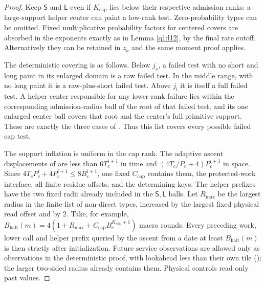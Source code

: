 \begin{proof}
Keep \(\mathsf S\) and \(\mathsf L\) even if \(K_{\mathrm{cap}}\) lies below their respective admission ranks: a large-support helper center can paint a low-rank test. Zero-probability types can be omitted. Fixed multiplicative probability factors for centered covers are absorbed in the exponents exactly as in Lemma \ref{q1:l12}, by the final rate cutoff. Alternatively they can be retained in \(z_{a}\) and the same moment proof applies.

The deterministic covering is as follows. Below \(j_{s}\), a failed test with no short and long paint in its enlarged domain is a raw failed test. In the middle range, with no long paint it is a raw-plus-short failed test. Above \(j_{l}\) it is itself a full failed test. A helper center responsible for any lower-rank failure lies within the corresponding admission-radius ball of the root of that failed test, and its one enlarged center ball covers that root and the center's full primitive support. These are exactly the three cases of \cite[Lemma~\ref*{cl:lem:joint}]{DMNoise1D2026}. Thus this list covers every possible failed cap test.

The support inflation is uniform in the cap rank. The adaptive ascent displacements of \cite[Lemma~\ref*{cl:lem:ascent}]{DMNoise1D2026} are less than \(6T_{c}^{i+1}\) in time and \((4T_{c}/P_{c}+4)P_{c}^{i+1}\) in space. Since \(4T_{c} P_{c}^{i}+4P_{c}^{i+1} \le  8 B_{c}^{i+1}\), one fixed \(C_{\mathrm{cap}}\) contains them, the protected-work interface, all finite residue offsets, and the determining keys. The helper prefixes have the two fixed radii already included in the \(\mathsf S,\mathsf L\) balls. Let \(R_{\mathrm{max}}\) be the largest radius in the finite list of non-direct types, increased by the largest fixed physical read offset and by 2. Take, for example, \(B_{\mathrm{halt}}(m)=4(1+R_{\mathrm{max}}+C_{\mathrm{cap}} B_{c}^{K_{\mathrm{cap}}+1})\) macro rounds. Every preceding work, lower call and helper prefix queried by the ascent from a date at least \(B_{\mathrm{halt}}(m)\) is then strictly after initialization. Future service observations are allowed only as observations in the deterministic proof, with lookahead less than their own tile (\cite[Lemma~\ref*{cl:lem:ascent}]{DMNoise1D2026}); the larger two-sided radius already contains them. Physical controls read only past values.


\end{proof}
